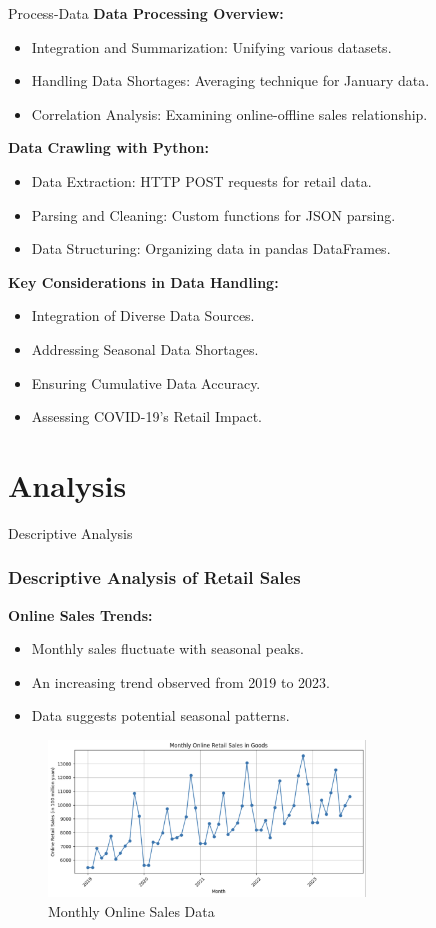 \documentclass{beamer}
\begin{document}
\begin{frame}{Process-Data}
  \textbf{Data Processing Overview:}
  \begin{itemize}
    \item Integration and Summarization: Unifying various datasets.
    \item Handling Data Shortages: Averaging technique for January data.
    \item Correlation Analysis: Examining online-offline sales relationship.
  \end{itemize}

  \textbf{Data Crawling with Python:}
  \begin{itemize}
    \item Data Extraction: HTTP POST requests for retail data.
    \item Parsing and Cleaning: Custom functions for JSON parsing.
    \item Data Structuring: Organizing data in pandas DataFrames.
  \end{itemize}

  \textbf{Key Considerations in Data Handling:}
  \begin{itemize}
    \item Integration of Diverse Data Sources.
    \item Addressing Seasonal Data Shortages.
    \item Ensuring Cumulative Data Accuracy.
    \item Assessing COVID-19's Retail Impact.
  \end{itemize}
\end{frame}



  
\section{Analysis}
\begin{frame}{Descriptive Analysis}

\frametitle{Descriptive Analysis of Retail Sales}

\textbf{Online Sales Trends:}
\begin{itemize}
    \item Monthly sales fluctuate with seasonal peaks.
    \item An increasing trend observed from 2019 to 2023.
    \item Data suggests potential seasonal patterns.
\end{itemize}
\begin{figure}
    \centering
    \includegraphics[width=0.75\textwidth]{online_sales_data.png}
    \caption{Monthly Online Sales Data}
\end{figure}
\end{frame}
\end{document}
